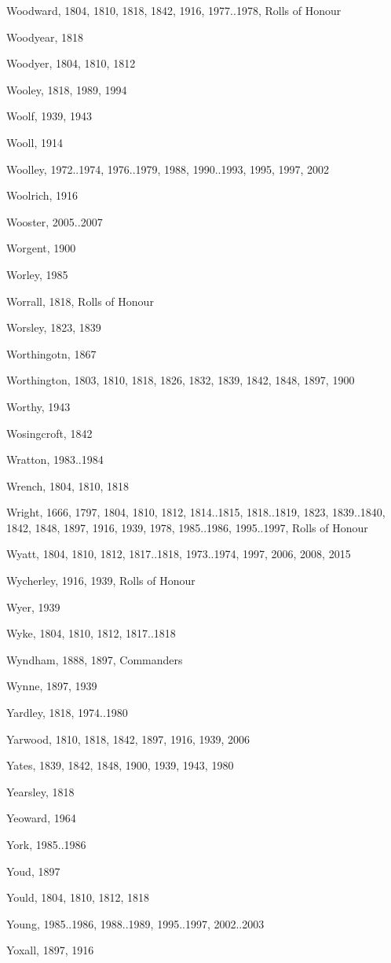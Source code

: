 {\begin{theindex}
\item Woodward, 1804, 1810, 1818, 1842, 1916, 1977..1978, Rolls of Honour
\item Woodyear, 1818
\item Woodyer, 1804, 1810, 1812
\item Wooley, 1818, 1989, 1994
\item Woolf, 1939, 1943
\item Wooll, 1914
\item Woolley, 1972..1974, 1976..1979, 1988, 1990..1993, 1995, 1997, 2002
\item Woolrich, 1916
\item Wooster, 2005..2007
\item Worgent, 1900
\item Worley, 1985
\item Worrall, 1818, Rolls of Honour
\item Worsley, 1823, 1839
\item Worthingotn, 1867
\item Worthington, 1803, 1810, 1818, 1826, 1832, 1839, 1842, 1848, 1897, 1900
\item Worthy, 1943
\item Wosingcroft, 1842
\item Wratton, 1983..1984
\item Wrench, 1804, 1810, 1818
\item Wright, 1666, 1797, 1804, 1810, 1812, 1814..1815, 1818..1819, 1823, 1839..1840, 1842, 1848, 1897, 1916, 1939, 1978, 1985..1986, 1995..1997, Rolls of Honour
\item Wyatt, 1804, 1810, 1812, 1817..1818, 1973..1974, 1997, 2006, 2008, 2015
\item Wycherley, 1916, 1939, Rolls of Honour
\item Wyer, 1939
\item Wyke, 1804, 1810, 1812, 1817..1818
\item Wyndham, 1888, 1897, Commanders
\item Wynne, 1897, 1939
\item Yardley, 1818, 1974..1980
\item Yarwood, 1810, 1818, 1842, 1897, 1916, 1939, 2006
\item Yates, 1839, 1842, 1848, 1900, 1939, 1943, 1980
\item Yearsley, 1818
\item Yeoward, 1964
\item York, 1985..1986
\item Youd, 1897
\item Yould, 1804, 1810, 1812, 1818
\item Young, 1985..1986, 1988..1989, 1995..1997, 2002..2003
\item Yoxall, 1897, 1916
\end{theindex}
}
